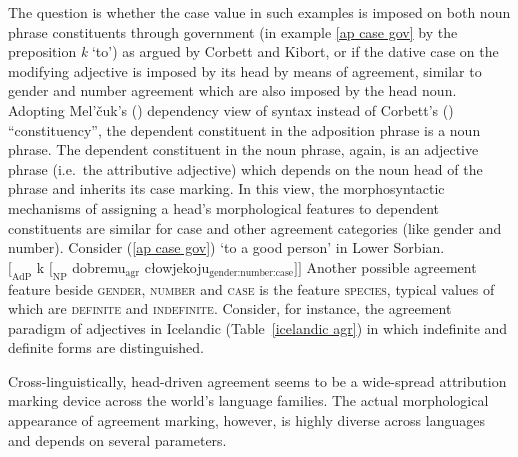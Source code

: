 The question is whether the case value in such examples is imposed on both noun phrase constituents through government (in example \ref{ap case gov} by the preposition \textit{k} ‘to’) as argued by Corbett and Kibort, or if the dative case on the modifying adjective is imposed by its head by means of agreement, similar to gender and number agreement which are also imposed by the head noun. Adopting Mel'čuk's (\citeyear[329, 337]{melcuk1993}) dependency view of syntax instead of Corbett's (\citeyear[133]{corbett2006}) “constituency”, the dependent constituent in the adposition phrase is a noun phrase. The dependent constituent in the noun phrase, again, is an adjective phrase (i.e.~the attributive adjective) which depends on the noun head of the phrase and inherits its case marking. In this view, the morphosyntactic mechanisms of assigning a head's morphological features to dependent constituents are similar for case and other agreement categories (like gender and number). Consider (\ref{ap case gov}) ‘to a good person’ in Lower Sorbian.
\ea
{}\\
$[_\textrm{AdP}$ k $[_\textrm{NP}$ dobremu$_\textrm{agr}$ cłowjekoju$_\textrm{gender:number:case} ] ]$
\z
Another possible agreement feature beside \textsc{gender, number} and \textsc{case} is the feature \textsc{species}, typical values of which are \textsc{definite} and \textsc{indefinite}. Consider, for instance, the agreement paradigm of adjectives in Icelandic (Table~\ref{icelandic agr}) in which indefinite and definite forms are distinguished.

Cross-linguistically, head\hyp{}driven agreement seems to be a wide-spread attribution marking device across the world's language families. The actual morphological appearance of agreement marking, however, is highly diverse across languages and depends on several parameters.

